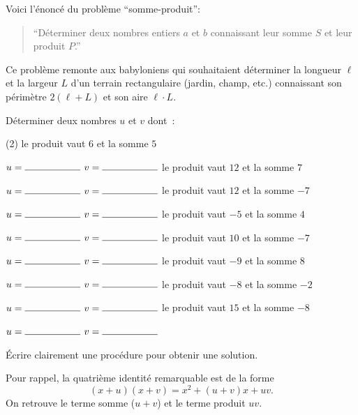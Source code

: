 \documentclass[a4paper,12pt]{report}
\begin{document}
\vspace*{-2\baselineskip}

Voici l'énoncé du problème \enquote{somme-produit}:
\begin{quote}
\enquote{Déterminer deux nombres entiers $a$ et $b$ connaissant leur somme $S$ et leur produit $P$.} 
\end{quote}
Ce problème remonte aux babyloniens qui souhaitaient déterminer la longueur $\ell$ et la largeur $L$ d'un terrain rectangulaire (jardin, champ, etc.) connaissant son périmètre $2(\ell+L)$ et son aire $\ell\cdot L$. 

\begin{exo}
Déterminer deux nombres $u$ et $v$ dont~:
	\begin{tasks}(2)
\task le produit vaut $6$ et la somme $5$

\vspace{15pt}
$u=\ligne{2}$ $v=\ligne{2}$
\task le produit vaut $12$ et la somme $7$

\vspace{15pt}
$u=\ligne{2}$ $v=\ligne{2}$
\task le produit vaut $12$ et la somme $-7$

\vspace{15pt}
$u=\ligne{2}$ $v=\ligne{2}$
\task le produit vaut $-5$ et la somme $4$

\vspace{15pt}
$u=\ligne{2}$ $v=\ligne{2}$
\task le produit vaut $10$ et la somme $-7$

\vspace{15pt}
$u=\ligne{2}$ $v=\ligne{2}$
\task le produit vaut $-9$ et la somme $8$

\vspace{15pt}
$u=\ligne{2}$ $v=\ligne{2}$
\task le produit vaut $-8$ et la somme $-2$

\vspace{15pt}
$u=\ligne{2}$ $v=\ligne{2}$
\task le produit vaut $15$ et la somme $-8$

\vspace{15pt}
$u=\ligne{2}$ $v=\ligne{2}$
\end{tasks}
\end{exo}

\begin{exo}
	Écrire clairement une procédure pour obtenir une solution.  

	\vspace{15pt}
	\myrulefill
	\vspace{15pt}

	\myrulefill
	\vspace{15pt}

	\myrulefill
	\vspace{15pt}

	\myrulefill
	\vspace{15pt}
\end{exo}
Pour rappel, la quatrième identité remarquable est de la forme
\[(x+u)(x+v)=x^2+(u+v)x+uv.\]
On retrouve le terme somme ($u+v$) et le terme produit $uv$.
\end{document}
